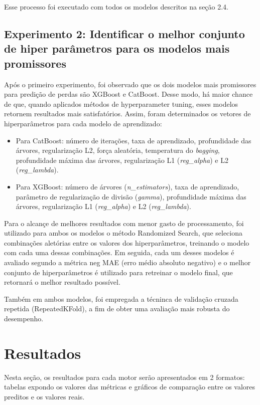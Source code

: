 \documentclass{article}
\begin{document}
Esse processo foi executado com todos os modelos descritos na seção 2.4.

\subsection{Experimento 2: Identificar o melhor conjunto de hiper parâmetros para os modelos mais promissores}

Após o primeiro experimento, foi observado que os dois modelos mais promissores para predição de perdas são XGBoost e CatBoost. Desse modo, há maior chance de que, quando aplicados métodos de hyperparameter tuning, esses modelos retornem resultados mais satisfatórios. Assim, foram determinados os vetores de hiperparâmetros para cada modelo de aprendizado:

\begin{itemize}
    \item Para CatBoost: número de iterações, taxa de aprendizado, profundidade das árvores, regularização L2, força aleatória, temperatura do \textit{bagging}, profundidade máxima das árvores, regularização L1 (\textit{reg\_alpha}) e L2 (\textit{reg\_lambda}).
    \item Para XGBoost: número de árvores (\textit{n\_estimators}), taxa de aprendizado, parâmetro de regularização de divisão (\textit{gamma}), profundidade máxima das árvores, regularização L1 (\textit{reg\_alpha}) e L2 (\textit{reg\_lambda}).
\end{itemize}

Para o alcançe de melhores resultados com menor gasto de processamento, foi utilizado para ambos os modelos o método Randomized Search, que seleciona combinações aletórias entre os valores dos hiperparâmetros, treinando o modelo com cada uma dessas combinações. Em seguida, cada um desses modelos é avaliado segundo a métrica neg MAE (erro médio absoluto negativo) e o melhor conjunto de hiperparâmetros é utilizado para retreinar o modelo final, que retornará o melhor resultado possível.

Também em ambos modelos, foi empregada a técninca de validação cruzada repetida (RepeatedKFold), a fim de obter uma avaliação mais robusta do desempenho.

\newpage

\section{Resultados}

Nesta seção, os resultados para cada motor serão apresentados em 2 formatos: tabelas expondo os valores das métricas e gráficos de comparação entre os valores preditos e os valores reais.
\end{document}
